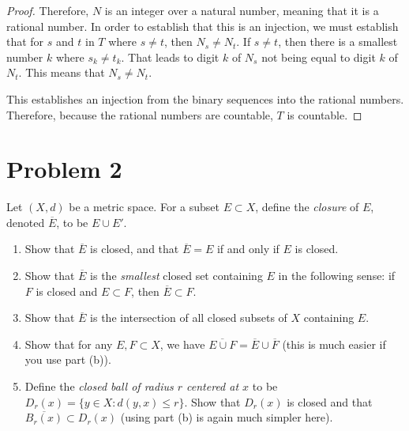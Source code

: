 \documentclass[11pt]{article}
\begin{document}
\begin{proof}
        Therefore, $N$ is an integer over a natural number, meaning that it is a rational number.
        In order to establish that this is an injection, we must establish that for $s$ and $t$ in $T$ where $s \neq t$, then $N_s \neq N_t$.
        If $s \neq t$, then there is a smallest number $k$ where $s_k \neq t_k$.
        That leads to digit $k$ of $N_s$ not being equal to digit $k$ of $N_t$.
        This means that $N_s \neq N_t$.

        This establishes an injection from the binary sequences into the rational numbers.
        Therefore, because the rational numbers are countable, $T$ is countable.
    \end{proof}

    \pagebreak

\section{Problem 2}
    Let $(X, d)$ be a metric space. For a subset $E \subset X$, define the \textit{closure} of $E$, denoted $\overline{E}$, to be $E \cup E'$.
    \begin{enumerate}[label=(\alph*)]
        \item 
        Show that $\overline{E}$ is closed, and that $\overline{E} = E$ if and only if $E$ is closed.

        \item 
        Show that $\overline{E}$ is the \textit{smallest} closed set containing $E$ in the following sense: if $F$ is closed and $E \subset F$, then $\overline{E} \subset F$.

        \item 
        Show that $\overline{E}$ is the intersection of all closed subsets of $X$ containing $E$.

        \item 
        Show that for any $E, F \subset X$, we have $\overline{E \cup F} = \overline{E} \cup \overline{F}$ (this is much easier if you use part (b)).

        \item 
        Define the \textit{closed ball of radius $r$ centered at $x$} to be $D_r(x) = \{y \in X : d(y, x) \leq r\}$. Show that $D_r(x)$ is closed and that $\overline{B_r(x)} \subset D_r(x)$ (using part (b) is again much simpler here).
        
    \end{enumerate}
\end{document}
